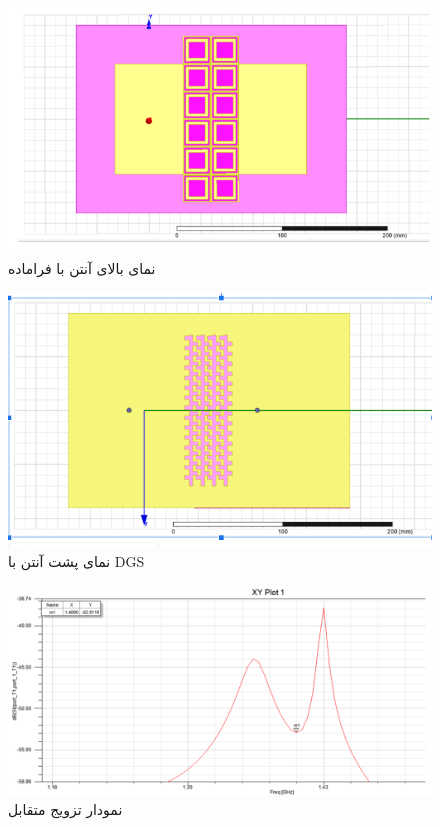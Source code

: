 \begin{figure}
	\centering
	\includegraphics[scale=0.5]{Images/fig42.png}
	\caption{نمای بالای آنتن با فراماده}
	\label{fig42}
\end{figure}


\begin{figure}
	\centering
	\includegraphics[scale=0.5]{Images/fig43.png}
	\caption{نمای پشت آنتن با DGS}
	\label{fig43}
\end{figure}

\begin{figure}
	\centering
	\includegraphics[scale=0.3]{Images/fig44.png}
	\caption{نمودار تزویج متقابل}
	\label{fig44}
\end{figure}

